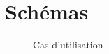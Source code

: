 \documentclass[a4paper,10pt,twoside]{sphinxmanual}
\begin{document}
\chapter{Schémas}
\label{schemas:schemas}\label{schemas::doc}\begin{figure}[htbp]
\centering
\capstart

\caption{Cas d'utilisation}\end{figure}
\end{document}
